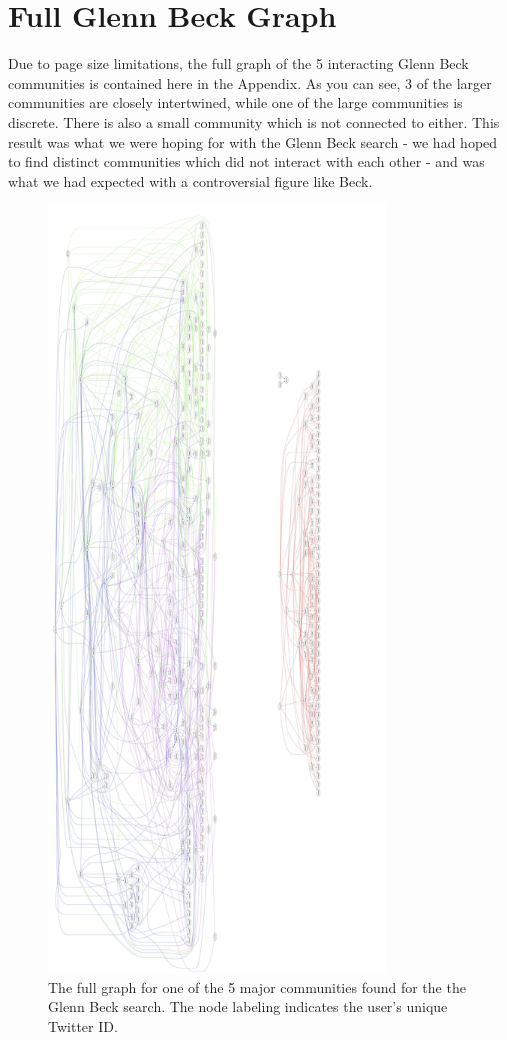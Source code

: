 \appendix   
\section{Full Glenn Beck Graph}
Due to page size limitations, the full graph of the 5 interacting Glenn Beck communities is contained here in the Appendix.  As you can see, 3 of the larger communities are closely intertwined, while one of the large communities is discrete.  There is also a small community which is not connected to either.  This result was what we were hoping for with the Glenn Beck search - we had hoped to find distinct communities which did not interact with each other - and was what we had expected with a controversial figure like Beck.
\begin{figure}
  \begin{center}
  \includegraphics[height=8in]{figures/GBFull.jpg}
  \end{center}
  \caption{The full graph for one of the 5 major communities found for the the Glenn Beck search.  The node labeling indicates the user's unique Twitter ID.}
  \label{figure:gbAppend}
\end{figure}
